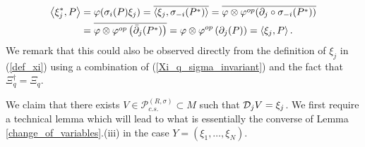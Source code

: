 	\begin{align*}
		\left\langle\xi_j^{*},P\right\rangle&=\varphi(\sigma_i(P)\xi_j)=\overline{\left\langle\xi_j,\sigma_{-i}(P^*)\right\rangle}=\overline{\varphi\otimes\varphi^{op}(\partial_j\circ\sigma_{-i}(P^*))}\\
					&=\overline{\varphi\otimes\varphi^{op}\left(\bar{\partial}_{j}(P^*)\right)}=\varphi\otimes\varphi^{op}\left(\partial_j(P)\right)=\left\langle\xi_j,P\right\rangle.
	\end{align*}
We remark that this could also be observed directly from the definition of $\xi_j$ in (\ref{def_xi}) using a combination of (\ref{Xi_q_sigma_invariant}) and the fact that $\Xi_q^\dagger=\Xi_q$.\par
We claim that there exists $V\in \mathscr{P}_{c.s.}^{(R,\sigma)}\subset M$ such that $\mathcal D_j V=\xi_j$. We first require a technical lemma which will lead to what is essentially the converse of Lemma \ref{change_of_variables}.(iii) in the case $Y=(\xi_1,\ldots, \xi_N)$.

